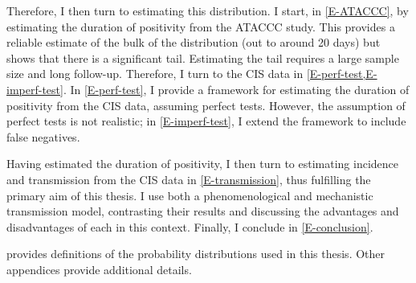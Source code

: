 \documentclass[thesis.tex]{subfiles}
\begin{document}
Therefore, I then turn to estimating this distribution.
I start, in \cref{E-ATACCC}, by estimating the duration of positivity from the ATACCC study.
This provides a reliable estimate of the bulk of the distribution (out to around 20 days) but shows that there is a significant tail.
Estimating the tail requires a large sample size and long follow-up. 
Therefore, I turn to the CIS data in \cref{E-perf-test,E-imperf-test}.
In \cref{E-perf-test}, I provide a framework for estimating the duration of positivity from the CIS data, assuming perfect tests.
However, the assumption of perfect tests is not realistic; in \cref{E-imperf-test}, I extend the framework to include false negatives.

Having estimated the duration of positivity, I then turn to estimating incidence and transmission from the CIS data in \cref{E-transmission}, thus fulfilling the primary aim of this thesis.
I use both a phenomenological and mechanistic transmission model, contrasting their results and discussing the advantages and disadvantages of each in this context.
Finally, I conclude in \cref{E-conclusion}.

 provides definitions of the probability distributions used in this thesis.
Other appendices provide additional details.

\ifSubfilesClassLoaded{
  \appendix
%   
  \listoftodos
}{}
\end{document}

